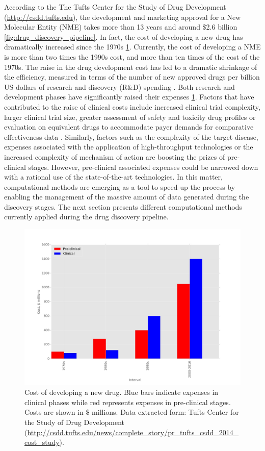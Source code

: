 \documentclass[12pt, b5paper,twoside]{tesi_upf}
\begin{document}
{\par  According to the The Tufts Center for the Study of Drug Development (\url{http://csdd.tufts.edu}), the development and marketing approval for a New Molecular Entity (NME) takes more than 13 years and around  $\$$2.6 billion \ref{fig:drug_discovery_pipeline}. In fact, the cost of developing a new drug has dramatically increased since the 1970s \ref{fig:drug_discovery_evolution}. Currently,  the cost of developing a NME is more than two times the 1990s cost, and more than ten times of the cost of the 1970s.   
The raise in the drug development cost has led to a dramatic shrinkage of the efficiency, measured in terms of the number of new approved drugs per billion US dollars of research and discovery (R$\&$D) spending \cite{Scannell2012}. Both research and development phases have significantly raised their expenses \ref{fig:drug_discovery_evolution}. Factors that have contributed to the raise of clinical costs include increased clinical trial complexity, larger clinical trial size, greater assessment of safety and toxicity drug profiles or evaluation on equivalent drugs to accommodate payer demands for comparative effectiveness data \cite{Scannell2012}. Similarly, factors such as the complexity of the target disease, expenses associated with the application of high-throughput technologies or the increased complexity of mechanism of action are boosting the prizes of pre-clinical stages. However, pre-clinical associated expenses could be narrowed down with a rational use of the state-of-the-art technologies. In this matter, computational methods are emerging as a tool to speed-up the process by enabling the management of the massive amount of data generated during the discovery stages. The next section presents different computational methods currently applied during the drug discovery pipeline.  
\begin{figure}[htbp]
\centering
\includegraphics[width=0.9\linewidth]{../figures/drug_discovery_evolution.jpg}
	\caption[Evolution of drug development expenses over time]{Cost of developing a new drug. Blue bars indicate expenses in clinical phases while red represents expenses in pre-clinical stages. Costs are shown in $\$$ millions. Data extracted form: Tufts Center for the Study of Drug Development (\url{http://csdd.tufts.edu/news/complete_story/pr_tufts_csdd_2014_cost_study}).}
\label{fig:drug_discovery_evolution}
	

\end{figure}}
\end{document}
